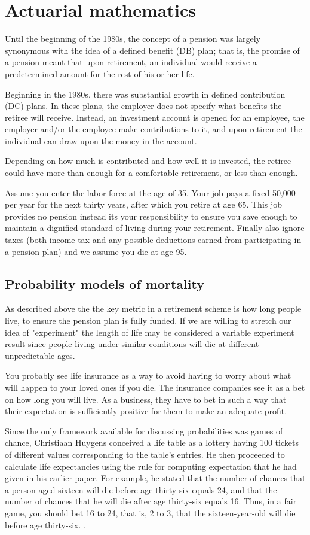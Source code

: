 \chapter{Actuarial mathematics}
Until the beginning of the 1980s, the concept of a pension was largely synonymous with the idea of a defined benefit (DB) plan; that is, the promise of a pension meant that upon retirement, an individual would receive a predetermined amount for the rest of his or her life.

Beginning in the 1980s, there was substantial growth in defined contribution (DC) plans. In these plans, the employer does not specify what benefits the retiree will receive. Instead, an investment account is opened for an employee, the employer and/or the employee make contributions to it, and upon retirement the individual can draw upon the money in the account.

Depending on how much is contributed and how well it is invested, the retiree could have more than enough for a comfortable retirement, or less than enough.

Assume you enter the labor force at the age of 35. Your job pays a fixed 50,000 per year for the next thirty years, after which you retire at age 65. This job provides no pension instead its your responsibility to ensure you save enough to maintain a dignified standard of living during your retirement. Finally also ignore taxes (both income tax and any possible deductions earned from participating in a pension plan) and we assume you die at age 95.

\section{Probability models of mortality}
As described above the  the key metric in a retirement scheme is how long people live, to ensure the pension plan is fully funded. If we are willing to stretch our idea of "experiment" the length of life may be considered a variable experiment result since people living under similar conditions will die at different unpredictable ages.

You probably see life insurance as a way to avoid having to worry about what will happen to your loved ones if you die. The insurance companies see it as a bet on how long you will live. As a business, they have to bet in such a way that their expectation is sufficiently positive for them to make an adequate profit.

Since the only framework available for discussing probabilities was games of chance, Christiaan Huygens conceived a life table as a lottery having 100 tickets of different values corresponding to the table’s entries. He then proceeded to calculate life expectancies using the rule for computing expectation that he had given in his earlier paper. For example, he stated that the number of chances that a person aged sixteen will die before age thirty-six equals 24, and that the number of chances that he will die after age thirty-six equals 16. Thus, in a fair game, you should bet 16 to 24, that is, 2 to 3, that the sixteen-year-old will die before age thirty-six.
.